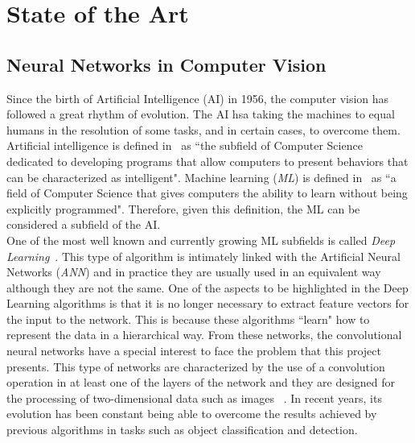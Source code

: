 \chapter{State of the Art}\label{cap.estadodelarte}
\setlength{\parindent}{0pt}
\section{Neural Networks in Computer Vision}
Since the birth of Artificial Intelligence (AI) in 1956, the computer vision has followed a great rhythm of evolution. The AI hsa taking the machines to equal humans in the resolution of some tasks, and in certain cases, to overcome them.
Artificial intelligence is defined in~\cite{mccarthy2006proposal} as ``the subfield of Computer Science dedicated to developing programs that allow computers to present behaviors that can be characterized as intelligent". Machine learning (\textit{ML}) is defined in~\cite{samuel2000some} as ``a field of Computer Science that gives computers the ability to learn without being explicitly programmed". Therefore, given this definition, the ML can be considered a subfield of the AI.\\
One of the most well known and currently growing ML subfields is called \textit{Deep Learning}~\cite{deng2014deep}. This type of algorithm is intimately linked with the Artificial Neural Networks (\textit{ANN}) and in practice they are usually used in an equivalent way although they are not the same. One of the aspects to be highlighted in the Deep Learning algorithms is that it is no longer necessary to extract feature vectors for the input to the network. This is because these algorithms ``learn" how to represent the data in a hierarchical way. From these networks, the convolutional neural networks have a special interest to face the problem that this project presents. This type of networks are characterized by the use of a convolution operation in at least one of the layers of the network and they are designed for the processing of two-dimensional data such as images ~\cite{liu2015implementation}. In recent years, its evolution has been constant being able to overcome the results achieved by previous algorithms in tasks such as object classification and detection.\\

